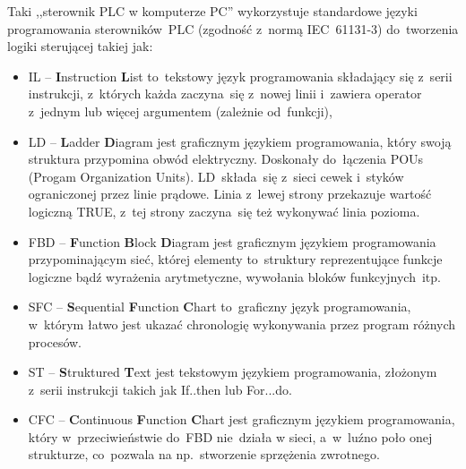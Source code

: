 Taki ,,sterownik PLC w komputerze PC'' wykorzystuje standardowe języki programowania sterowników~PLC (zgodność z~normą IEC~61131-3) do~tworzenia logiki sterującej takiej jak:
\begin{itemize}
\item IL -- \textbf{I}nstruction \textbf{L}ist to~tekstowy język programowania składający się z~serii instrukcji, z~których każda zaczyna~się z~nowej linii i~zawiera operator z~jednym lub więcej argumentem (zależnie od~funkcji),

\item LD -- \textbf{L}adder \textbf{D}iagram jest graficznym językiem programowania, który swoją struktura przypomina obwód elektryczny. Doskonały do~łączenia POUs (Progam Organization Units). LD~składa~się z~sieci cewek i~styków ograniczonej przez linie prądowe. Linia z~lewej strony przekazuje wartość logiczną TRUE, z~tej strony zaczyna~się też wykonywać linia pozioma.

\item FBD -- \textbf{F}unction \textbf{B}lock \textbf{D}iagram jest graficznym językiem programowania przypominającym sieć, której elementy to~struktury reprezentujące funkcje logiczne bądź wyrażenia arytmetyczne, wywołania bloków funkcyjnych~itp.

\item SFC -- \textbf{S}equential \textbf{F}unction \textbf{C}hart to~graficzny język programowania, w~którym łatwo jest ukazać chronologię wykonywania przez program różnych procesów.

\item ST -- \textbf{S}truktured \textbf{T}ext jest tekstowym językiem programowania, złożonym z~serii instrukcji takich jak If..then lub For...do.

\item CFC -- \textbf{C}ontinuous \textbf{F}unction \textbf{C}hart jest graficznym językiem programowania, który w~przeciwieństwie do~FBD nie~działa w sieci, a~w~luźno poło onej strukturze, co~pozwala na np.~stworzenie sprzężenia zwrotnego.
\end{itemize}

